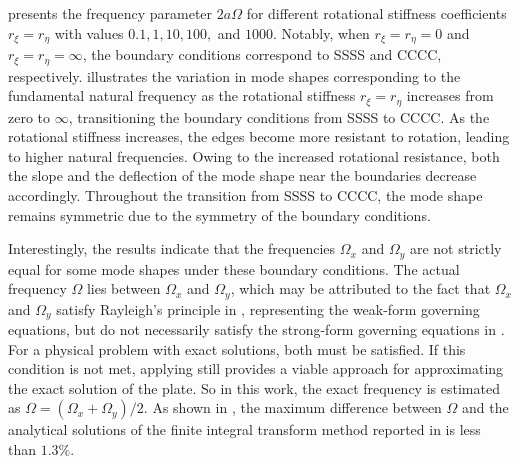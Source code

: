 \documentclass[preprint,12pt,number]{elsarticle}
\begin{document}
 presents the frequency parameter $2a\Omega $ for different rotational stiffness coefficients  $ r_{\xi} = r_{\eta} $ with values $ 0.1, 1, 10, 100, $ and $ 1000$.  
Notably, when $ r_{\xi} = r_{\eta} = 0 $ and $r_{\xi} = r_{\eta} = \infty$, the boundary conditions correspond to SSSS and CCCC, respectively.  
 illustrates the variation in mode shapes corresponding to the fundamental natural frequency as the rotational stiffness $r_{\xi} = r_{\eta}$ increases from zero to $\infty$, transitioning the boundary conditions from SSSS to CCCC.
As the rotational stiffness increases, the edges become more resistant to rotation, leading to higher natural frequencies. 
Owing to the increased rotational resistance, both the slope and the deflection of the mode shape near the boundaries decrease accordingly. 
Throughout the transition from SSSS to CCCC, the mode shape remains symmetric due to the symmetry of the boundary conditions.

Interestingly, the results indicate that the frequencies $\Omega_x$ and $\Omega_y$ are not strictly equal for some mode shapes under these boundary conditions.  
The actual frequency $\Omega$ lies between $\Omega_x$ and $\Omega_y$, which may be attributed to the fact that $\Omega_x$ and $\Omega_y$ satisfy Rayleigh’s principle in , representing the weak-form governing equations, but do not necessarily satisfy the strong-form governing equations in .
For a physical problem with exact solutions, both  must be satisfied.  
If this condition is not met, applying  still provides a viable approach for approximating the exact solution of the plate.  
So in this work, the exact frequency is estimated as $\Omega = (\Omega_x + \Omega_y)/2$.  
As shown in , the maximum difference between \(\Omega\) and the analytical solutions of the finite integral transform method reported in  is less than $1.3\%$.
\end{document}
